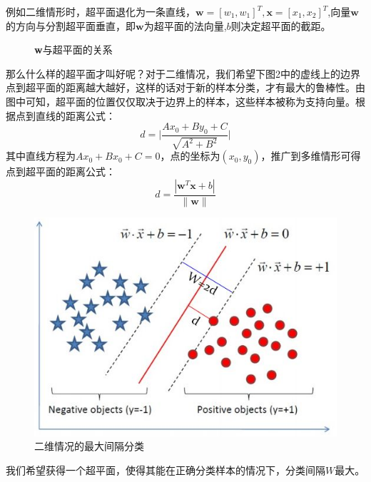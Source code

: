 \documentclass[UTF8]{ctexart} %
\begin{document}
\begin{multicols}{2}
				例如二维情形时，超平面退化为一条直线，$\bm{w}=[w_1,w_1]^T,\bm{x}=[x_1,x_2]^T$,向量$\bm{w}$的方向与分割超平面垂直，即$\bm{w}$为超平面的法向量,$b$则决定超平面的截距。
				\begin{figure}[H]
					\caption{\textbf{w}与超平面的关系}
				\end{figure}
				那么什么样的超平面才叫好呢？对于二维情况，我们希望下图2中的虚线上的边界点到超平面的距离越大越好，这样的话对于新的样本分类，才有最大的鲁棒性。由图中可知，超平面的位置仅仅取决于边界上的样本，这些样本被称为支持向量。根据点到直线的距离公式：
				\[d=\bigg|\frac{Ax_0+By_0+C}{\sqrt{A^2+B^2}}\bigg|\]
				其中直线方程为$Ax_0+Bx_0+C=0$，点的坐标为$(x_0,y_0)$，推广到多维情形可得点到超平面的距离公式：
				\[d=\frac{|\bm{w}^T\bm{x}+b|}{\|\bm{w}\|}\]	
				\begin{figure}[H]
					\centering\includegraphics[scale=0.4]{2.png}
					\caption{二维情况的最大间隔分类}
				\end{figure}
				我们希望获得一个超平面，使得其能在正确分类样本的情况下，分类间隔$W$最大。
				

\end{multicols}
\end{document}
